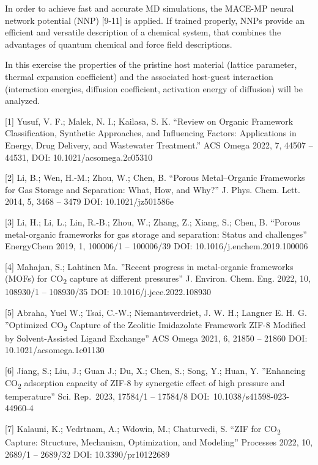 \documentclass[
  letterpaper,
]{article}
\begin{document}
In order to achieve fast and accurate MD simulations, the MACE-MP neural
network potential (NNP) {[}9-11{]} is applied. If trained properly, NNPs
provide an efficient and versatile description of a chemical system,
that combines the advantages of quantum chemical and force field
descriptions.

In this exercise the properties of the pristine host material (lattice
parameter, thermal expansion coefficient) and the associated host-guest
interaction (interaction energies, diffusion coefficient, activation
energy of diffusion) will be analyzed.

{[}1{]} Yusuf, V. F.; Malek, N. I.; Kailasa, S. K. ``Review on Organic
Framework Classification, Synthetic Approaches, and Influencing Factors:
Applications in Energy, Drug Delivery, and Wastewater Treatment.'' ACS
Omega 2022, 7, 44507 -- 44531, DOI: 10.1021/acsomega.2c05310

{[}2{]} Li, B.; Wen, H.-M.; Zhou, W.; Chen, B. ``Porous Metal--Organic
Frameworks for Gas Storage and Separation: What, How, and Why?'' J.
Phys. Chem. Lett. 2014, 5, 3468 -- 3479 DOI: 10.1021/jz501586e

{[}3{]} Li, H.; Li, L.; Lin, R.-B.; Zhou, W.; Zhang, Z.; Xiang, S.;
Chen, B. ``Porous metal-organic frameworks for gas storage and
separation: Status and challenges'' EnergyChem 2019, 1, 100006/1 --
100006/39 DOI: 10.1016/j.enchem.2019.100006

{[}4{]} Mahajan, S.; Lahtinen Ma. ''Recent progress in metal-organic
frameworks (MOFs) for CO\textsubscript{2} capture at different
pressures'' J. Environ. Chem. Eng. 2022, 10, 108930/1 -- 108930/35 DOI:
10.1016/j.jece.2022.108930

{[}5{]} Abraha, Yuel W.; Tsai, C.-W.; Niemantsverdriet, J. W. H.;
Langner E. H. G. ''Optimized CO\textsubscript{2} Capture of the Zeolitic
Imidazolate Framework ZIF-8 Modified by Solvent-Assisted Ligand
Exchange'' ACS Omega 2021, 6, 21850 -- 21860 DOI:
10.1021/acsomega.1c01130

{[}6{]} Jiang, S.; Liu, J.; Guan J.; Du, X.; Chen, S.; Song, Y.; Huan,
Y. ''Enhancing CO\textsubscript{2} adsorption capacity of ZIF‑8 by
synergetic effect of high pressure and temperature'' Sci. Rep.~2023,
17584/1 -- 17584/8 DOI:~10.1038/s41598-023-44960-4

{[}7{]} Kalauni, K.; Vedrtnam, A.; Wdowin, M.; Chaturvedi, S. ``ZIF for
CO\textsubscript{2} Capture: Structure, Mechanism, Optimization, and
Modeling'' Processes 2022, 10, 2689/1 -- 2689/32 DOI: 10.3390/pr10122689
\end{document}
